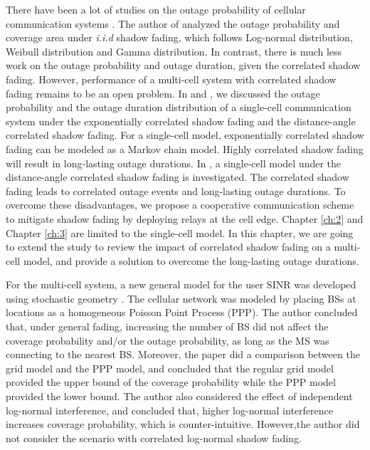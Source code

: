  \par There have been a lot of studies on the outage probability of cellular communication systems \cite{abu1991outage, petrovic2013outage, emamian2014outage}. The author of \cite{vural2015effect} analyzed the outage probability and coverage area under \emph{i.i.d} shadow fading, which follows Log-normal distribution, Weibull distribution and Gamma distribution. In contrast, there is much less work on the outage probability and outage duration, given the correlated shadow fading. However, performance of a multi-cell system with correlated shadow fading remains to be an open problem. In \cite{lu2015long} and \cite{lu2015shining}, we discussed the outage probability and the outage duration distribution of a single-cell communication system under the exponentially correlated shadow fading and the distance-angle correlated shadow fading. For a single-cell model, exponentially correlated shadow fading can be modeled as a Markov chain model. Highly correlated shadow fading will result in long-lasting outage durations. In \cite{lu2015shining}, a single-cell model under the distance-angle correlated shadow fading is investigated. The correlated shadow fading leads to correlated outage events and long-lasting outage durations. To overcome these disadvantages, we propose a cooperative communication scheme to mitigate shadow fading by deploying relays at the cell edge. Chapter \ref{ch:2} and Chapter \ref{ch:3} are limited to the single-cell model. In this chapter, we are going to extend the study to review the impact of correlated shadow fading on a multi-cell model, and provide a solution to overcome the long-lasting outage durations.
 
 
 
 \par For the multi-cell system, a new general model for the user SINR was developed using stochastic geometry \cite{andrews2011tractable}. The cellular network was modeled by placing BSs at locations as a homogeneous Poisson Point Process (PPP). The author concluded that, under general fading, increasing the number of BS did not affect the coverage probability and/or the outage probability, as long as the MS was connecting to the nearest BS. Moreover, the paper did a comparison between the grid model and the PPP model, and concluded that the regular grid model provided the upper bound of the coverage probability while the PPP model provided the lower bound. The author also considered the effect of independent log-normal interference, and concluded that, higher log-normal interference increases coverage probability, which is counter-intuitive. However,the author did not consider the scenario with correlated log-normal shadow fading. 
 
